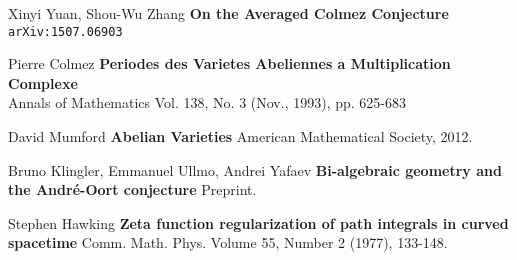 \documentclass[12pt]{article}
\begin{document}
\begin{thebibliography}{}

\item Xinyi Yuan, Shou-Wu Zhang \textbf{On the Averaged Colmez Conjecture} \texttt{arXiv:1507.06903}

\item Pierre Colmez \textbf{Periodes des Varietes Abeliennes a Multiplication Complexe} \\ Annals of Mathematics Vol. 138, No. 3 (Nov., 1993), pp. 625-683

\item David Mumford \textbf{Abelian Varieties} American Mathematical Society, 2012.

\item Bruno Klingler, Emmanuel Ullmo, Andrei Yafaev
\textbf{Bi-algebraic geometry and the André-Oort conjecture} Preprint.

\item Stephen Hawking \textbf{Zeta function regularization of path integrals in curved spacetime} Comm. Math. Phys.
Volume 55, Number 2 (1977), 133-148.

\end{thebibliography}
\end{document}
